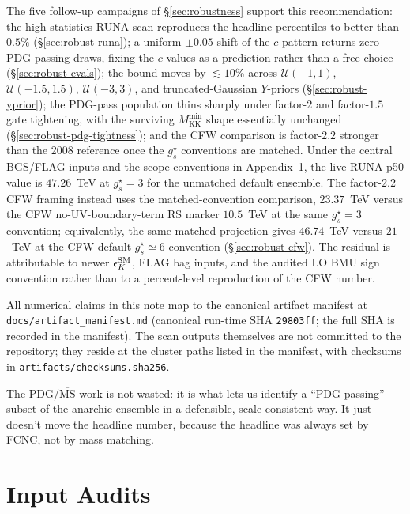 \documentclass[11pt]{article}
\newcommand{\Mkk}{M_{\mathrm{KK}}}
\newcommand{\gs}{g_s^{\star}}
\newcommand{\msbar}{\overline{\mathrm{MS}}}
\begin{document}
The five follow-up campaigns of \S\ref{sec:robustness} support this
recommendation: the high-statistics RUNA scan reproduces the headline
percentiles to better than $0.5\%$ (\S\ref{sec:robust-runa}); a uniform
$\pm 0.05$ shift of the $c$-pattern returns zero PDG-passing draws,
fixing the $c$-values as a prediction rather than a free choice
(\S\ref{sec:robust-cvals}); the bound moves by $\lesssim 10\%$ across
$\mathcal{U}(-1,1)$, $\mathcal{U}(-1.5,1.5)$, $\mathcal{U}(-3,3)$, and
truncated-Gaussian $Y$-priors (\S\ref{sec:robust-yprior}); the
PDG-pass population thins sharply under factor-$2$ and factor-$1.5$
gate tightening, with the surviving $\Mkk^{\min}$ shape essentially
unchanged (\S\ref{sec:robust-pdg-tightness}); and the CFW comparison is
factor-$2.2$ stronger than the 2008 reference once the $g_s^\star$
conventions are matched.  Under the central BGS/FLAG inputs and the scope
conventions in Appendix~\ref{app:input-audits}, the live RUNA p50 value
is $47.26$~TeV at $\gs=3$ for the unmatched default ensemble. The
factor-$2.2$ CFW framing instead uses the matched-convention comparison,
$23.37$~TeV versus the CFW no-UV-boundary-term RS marker
$10.5$~TeV at the same $\gs=3$ convention; equivalently, the same matched
projection gives $46.74$~TeV versus $21$~TeV at the CFW default
$\gs\simeq6$ convention (\S\ref{sec:robust-cfw}).  The residual is
attributable to newer
$\epsilon_K^{\rm SM}$, FLAG bag inputs, and the audited LO BMU sign
convention rather than to a percent-level reproduction of the CFW number.

All numerical claims in this note map to the canonical artifact manifest at
\texttt{docs/artifact\_manifest.md} (canonical run-time SHA
\texttt{29803ff}; the full SHA is recorded in the manifest). The scan
outputs themselves are not committed to the repository; they reside at
the cluster paths listed in the manifest, with checksums in
\texttt{artifacts/checksums.sha256}.

The PDG/$\msbar$ work is not wasted: it is what lets us identify a
``PDG-passing'' subset of the anarchic ensemble in a defensible,
scale-consistent way. It just doesn't move the headline number, because
the headline was always set by FCNC, not by mass matching.

\appendix

\section{Input Audits}
\label{app:input-audits}
\end{document}
